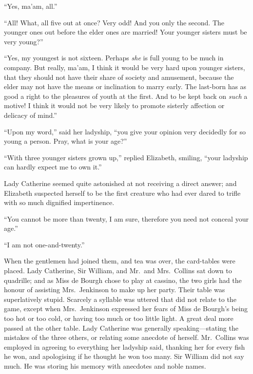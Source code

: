 \documentclass[12pt,english]{book}
\begin{document}
{}``Yes, ma'am, all.''

{}``All! What, all five out at once? Very odd! And you only the second.
The younger ones out before the elder ones are married! Your younger
sisters must be very young?''\ 

{}``Yes, my youngest is not sixteen. Perhaps \textit{she} is full
young to be much in company. But really, ma'am, I think it would be
very hard upon younger sisters, that they should not have their share
of society and amusement, because the elder may not have the means
or inclination to marry early. The last-born has as good a right to
the pleasures of youth at the first. And to be kept back on \textit{such}
a motive! I think it would not be very likely to promote sisterly
affection or delicacy of mind.''

{}``Upon my word,'' said her ladyship, {}``you give your opinion
very decidedly for so young a person. Pray, what is your age?''\ 

{}``With three younger sisters grown up,'' replied Elizabeth, smiling,
{}``your ladyship can hardly expect me to own it.''

Lady Catherine seemed quite astonished at not receiving a direct answer;
and Elizabeth suspected herself to be the first creature who had ever
dared to trifle with so much dignified impertinence.

{}``You cannot be more than twenty, I am sure, therefore you need
not conceal your age.''

{}``I am not one-and-twenty.''

When the gentlemen had joined them, and tea was over, the card-tables
were placed. Lady Catherine, Sir William, and Mr.\ and Mrs.\ Collins
sat down to quadrille; and as Miss de Bourgh chose to play at cassino,
the two girls had the honour of assisting Mrs.\ Jenkinson to make
up her party. Their table was superlatively stupid. Scarcely a syllable
was uttered that did not relate to the game, except when Mrs.\ Jenkinson
expressed her fears of Miss de Bourgh's being too hot or too cold,
or having too much or too little light. A great deal more passed at
the other table. Lady Catherine was generally speaking\mbox{---}stating
the mistakes of the three others, or relating some anecdote of herself.
Mr.\ Collins was employed in agreeing to everything her ladyship
said, thanking her for every fish he won, and apologising if he thought
he won too many. Sir William did not say much. He was storing his
memory with anecdotes and noble names.
\end{document}
